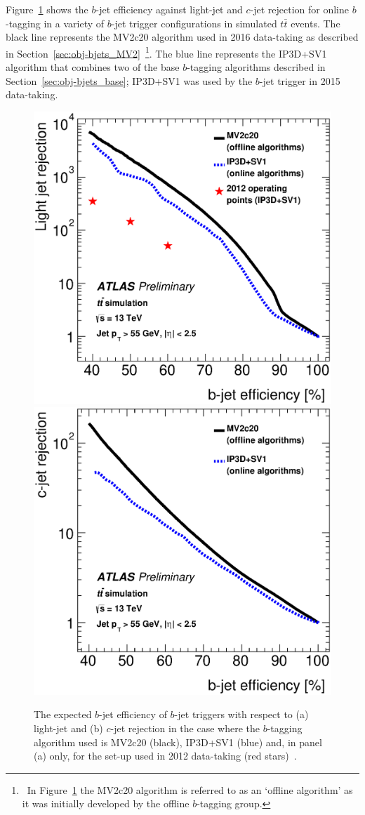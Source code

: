 Figure~\ref{fig:trig-bTrig_perf} shows the $b$-jet efficiency against light-jet and $c$-jet rejection
for online $b$-tagging in a variety of $b$-jet trigger configurations in simulated $t\bar{t}$ events.
The black line represents the MV2c20 algorithm used in 2016 data-taking as described in Section~\ref{sec:obj-bjets_MV2}~\footnote{\ In
  Figure~\ref{fig:trig-bTrig_perf} the MV2c20 algorithm is referred to as an `offline algorithm' as it was initially developed by the offline $b$-tagging group.}.
The blue line represents the IP3D+SV1 algorithm that combines two of the base $b$-tagging algorithms described in Section~\ref{sec:obj-bjets_base};
IP3D+SV1 was used by the $b$-jet trigger in 2015 data-taking.

\begin{figure}[!ht]
  \begin{center}
    \includegraphics[width=0.48\linewidth, angle=0]{figs/Trigger/trig-bTrig_perf_light.eps}
    \includegraphics[width=0.48\linewidth, angle=0]{figs/Trigger/trig-bTrig_perf_charm.eps}
  \end{center}
  \vspace{-1em}
  \caption[The expected $b$-jet efficiency of $b$-jet triggers in Run-2 compared to the set-up used in 2012 data-taking.]
    {The expected $b$-jet efficiency of $b$-jet triggers with respect to (a) light-jet and (b) $c$-jet rejection
    in the case where the $b$-tagging algorithm used is MV2c20 (black), IP3D+SV1 (blue) and, in panel (a) only, for the set-up used in 2012 data-taking (red stars)~\cite{trig-bTrig_desc}.}
  \label{fig:trig-bTrig_perf}
\end{figure}


